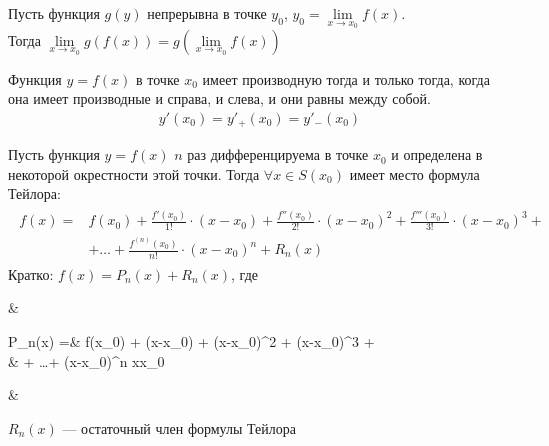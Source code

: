 \begin{theorem}
  Пусть функция $g(y)$ непрерывна в точке $y_0$, $y_0 = \lim\limits_{x\to x_0}f(x)$.\\
  Тогда $\lim\limits_{x\to x_0}g(f(x)) = g\left(\lim\limits_{x\to x_0}f(x)\right)$
\end{theorem}

\begin{theorem}
  Функция $y = f(x)$ в точке $x_0$ имеет производную тогда и только тогда, когда она имеет производные и справа, и слева, и они равны между собой.
  \begin{align*}
    y'(x_0) = y'_+(x_0)=y'_-(x_0)
  \end{align*}
\end{theorem}

\setcounter{equation}{0}
\begin{theorem}
	Пусть функция $y=f(x)$ $n$ раз дифференцируема в точке $x_0$ и определена в некоторой окрестности этой точки. Тогда $\forall x \in S(x_0)$ имеет место формула Тейлора:
	\begin{align}
		\begin{aligned}
			f(x) =& f(x_0)  + \frac{f'(x_0)}{1!}\cdot (x-x_0) + \frac{f''(x_0)}{2!}\cdot (x-x_0)^2 + \frac{f'''(x_0)}{3!}\cdot (x-x_0)^3 + \\
			              & + \ldots + \frac{f^{(n)}(x_0)}{n!}\cdot (x-x_0)^n + R_n(x)
		\end{aligned}
	\end{align}
	Кратко: $f(x) = P_n(x) + R_n(x)$, где
	\begin{flalign*}
		&\begin{aligned}
		P_n(x) =& f(x_0)  + \cdot (x-x_0) + \cdot (x-x_0)^2 + \cdot (x-x_0)^3 + \\
		& + \ldots + \cdot (x-x_0)^n \hspace{2cm} \qquad x\to x_0
		\end{aligned}  &
	\end{flalign*}
	$R_n(x)$ --- остаточный член формулы Тейлора
\end{theorem}

\newpage
